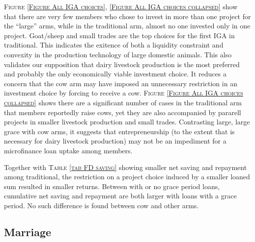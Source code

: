 \begin{palepinkleftbar}
\begin{finding}
\textsc{\small Figure \ref{Figure All IGA choices}, \ref{Figure All IGA choices collapsed}} show that there are very few members who chose to invest in more than one project for the ``large'' arms, while in the \textsf{traditional} arm, almost no one invested only in one project. Goat/sheep and small trades are the top choices for the first IGA in \textsf{traditional}. This indicates the exitence of both a liquidity constraint and convexity in the production technology of large domestic animals. This also validates our supposition that dairy livestock production is the most preferred and probably the only economically viable investment choice. It reduces a concern that the \textsf{cow} arm may have imposed an unnecessary restriction in an investment choice by forcing to receive a cow. \textsc{\small Figure \ref{Figure All IGA choices collapsed}} shows there are a significant number of cases in the \textsf{traditional} arm that members reportedly raise cows, yet they are also accompanied by pararell projects in smaller livestock production and small trades. Contrasting \textsf{large}, \textsf{large grace} with \textsf{cow} arms, it suggests that entrepreneurship (to the extent that is necessary for dairy livestock production) may not be an impediment for a microfinance loan uptake among members.
\end{finding}
\end{palepinkleftbar}

Together with \textsc{\small Table \ref{tab FD saving}} showing smaller net saving and repayment among \textsf{traditional}, the restriction on a project choice induced by a smaller loaned sum resulted in smaller returns. Between with or no grace period loans, cumulative net saving and repayment are both larger with loans with a grace period. No such difference is found between \textsf{cow} and other arms.


\subsection{Marriage}

